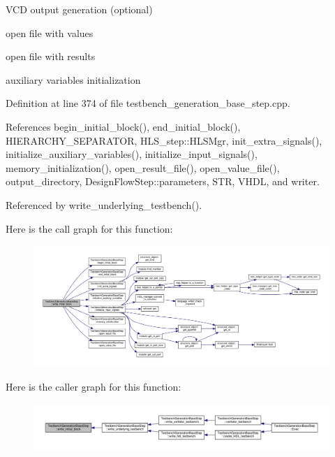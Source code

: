 V\+CD output generation (optional)

open file with values

open file with results

auxiliary variables initialization 

Definition at line 374 of file testbench\+\_\+generation\+\_\+base\+\_\+step.\+cpp.



References begin\+\_\+initial\+\_\+block(), end\+\_\+initial\+\_\+block(), H\+I\+E\+R\+A\+R\+C\+H\+Y\+\_\+\+S\+E\+P\+A\+R\+A\+T\+OR, H\+L\+S\+\_\+step\+::\+H\+L\+S\+Mgr, init\+\_\+extra\+\_\+signals(), initialize\+\_\+auxiliary\+\_\+variables(), initialize\+\_\+input\+\_\+signals(), memory\+\_\+initialization(), open\+\_\+result\+\_\+file(), open\+\_\+value\+\_\+file(), output\+\_\+directory, Design\+Flow\+Step\+::parameters, S\+TR, V\+H\+DL, and writer.



Referenced by write\+\_\+underlying\+\_\+testbench().

Here is the call graph for this function\+:
\nopagebreak
\begin{figure}[H]
\begin{center}
\leavevmode
\includegraphics[width=350pt]{dc/d02/classTestbenchGenerationBaseStep_a8bfbb6d0854685400127ee0ed68908cd_cgraph}
\end{center}
\end{figure}
Here is the caller graph for this function\+:
\nopagebreak
\begin{figure}[H]
\begin{center}
\leavevmode
\includegraphics[width=350pt]{dc/d02/classTestbenchGenerationBaseStep_a8bfbb6d0854685400127ee0ed68908cd_icgraph}
\end{center}
\end{figure}
\mbox{\label{classTestbenchGenerationBaseStep_a7568b1b1e16628fecd673da73e8ed71b}} 
